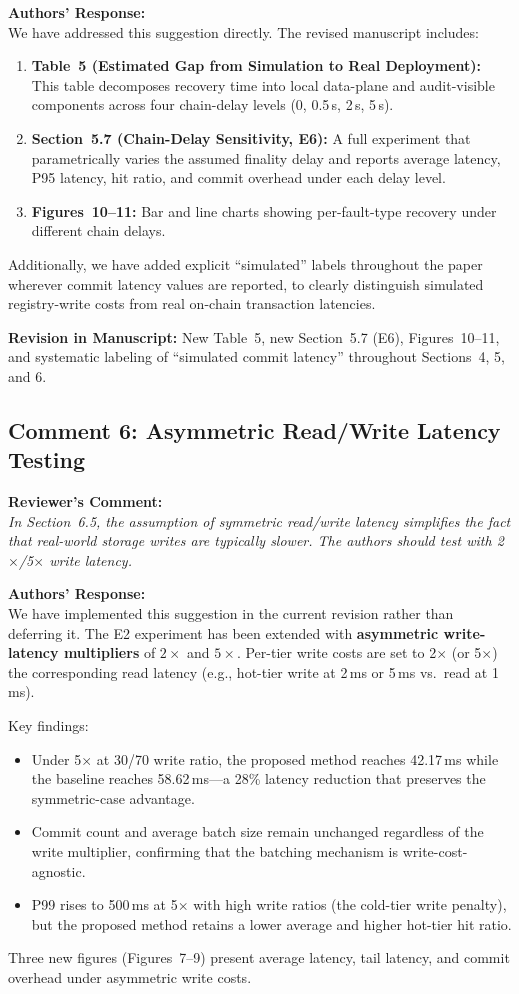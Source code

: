 \documentclass[11pt,a4paper]{article}
\newcommand{\reviewercomment}[1]{%
  \vspace{6pt}\noindent\textbf{\textcolor{reviewercolor}{Reviewer's Comment:}}\\
  \textcolor{reviewercolor}{\itshape #1}\vspace{4pt}}
\newcommand{\response}[1]{%
  \noindent\textbf{\textcolor{responsecolor}{Authors' Response:}}\\
  #1\vspace{8pt}}
\newcommand{\revision}[1]{%
  \noindent\textbf{Revision in Manuscript:} #1\vspace{4pt}}
\begin{document}
\response{We have addressed this suggestion directly. The revised manuscript includes:

\begin{enumerate}[nosep]
\item \textbf{Table~5 (Estimated Gap from Simulation to Real Deployment):} This table decomposes recovery time into local data-plane and audit-visible components across four chain-delay levels (0, 0.5\,s, 2\,s, 5\,s).
\item \textbf{Section~5.7 (Chain-Delay Sensitivity, E6):} A full experiment that parametrically varies the assumed finality delay and reports average latency, P95 latency, hit ratio, and commit overhead under each delay level.
\item \textbf{Figures~10--11:} Bar and line charts showing per-fault-type recovery under different chain delays.
\end{enumerate}

Additionally, we have added explicit ``simulated'' labels throughout the paper wherever commit latency values are reported, to clearly distinguish simulated registry-write costs from real on-chain transaction latencies.}

\revision{New Table~5, new Section~5.7 (E6), Figures~10--11, and systematic labeling of ``simulated commit latency'' throughout Sections~4, 5, and 6.}

\subsection*{Comment 6: Asymmetric Read/Write Latency Testing}

\reviewercomment{In Section~6.5, the assumption of symmetric read/write latency simplifies the fact that real-world storage writes are typically slower. The authors should test with 2$\times$/5$\times$ write latency.}

\response{We have implemented this suggestion in the current revision rather than deferring it. The E2 experiment has been extended with \textbf{asymmetric write-latency multipliers} of $2\times$ and $5\times$. Per-tier write costs are set to 2$\times$ (or 5$\times$) the corresponding read latency (e.g., hot-tier write at 2\,ms or 5\,ms vs.\ read at 1\,ms).

Key findings:
\begin{itemize}[nosep]
\item Under 5$\times$ at 30/70 write ratio, the proposed method reaches 42.17\,ms while the baseline reaches 58.62\,ms---a 28\% latency reduction that preserves the symmetric-case advantage.
\item Commit count and average batch size remain unchanged regardless of the write multiplier, confirming that the batching mechanism is write-cost-agnostic.
\item P99 rises to 500\,ms at 5$\times$ with high write ratios (the cold-tier write penalty), but the proposed method retains a lower average and higher hot-tier hit ratio.
\end{itemize}

Three new figures (Figures~7--9) present average latency, tail latency, and commit overhead under asymmetric write costs.}
\end{document}
